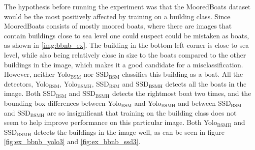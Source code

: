 The hypothesis before running the experiment was that the MooredBoats dataset would be the most positively affected by training on a building class. Since MooredBoats consists of mostly moored boats, where there are images that contain buildings close to sea level one could suspect could be mistaken as boats, as shown in \ref{img:bbnb_ex}. The building in the bottom left corner is close to sea level, while also being relatively close in size to the boats compared to the other buildings in the image, which makes it a good candidate for a misclassification. However, neither Yolo$_{\text{BSM}}$ nor SSD$_{\text{BSM}}$ classifies this building as a boat. All the detectors, Yolo$_{\text{BSM}}$, Yolo$_{\text{BSMH}}$, SSD$_{\text{BSM}}$ and SSD$_{\text{BSMH}}$ detects all the boats in the image. Both SSD$_{\text{BSM}}$ and SSD$_{\text{BSMH}}$ detects the rightmost boat two times, and the bounding box differences between Yolo$_{\text{BSM}}$ and Yolo$_{\text{BSMH}}$ and between SSD$_{\text{BSM}}$ and SSD$_{\text{BSMH}}$ are so insignificant that training on the building class does not seem to help improve performance on this particular image. Both Yolo$_{\text{BSMH}}$ and SSD$_{\text{BSMH}}$ detects the buildings in the image well, as can be seen in figure \ref{fig:ex_bbnb_yolo3} and \ref{fig:ex_bbnb_ssd3}.


